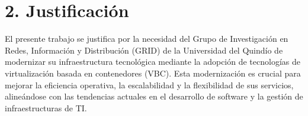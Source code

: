 \section*{2. Justificación}
El presente trabajo se justifica por la necesidad del Grupo de Investigación en Redes, Información y Distribución (GRID) de la Universidad del Quindío de modernizar su infraestructura tecnológica mediante la adopción de tecnologías de virtualización basada en contenedores (VBC). Esta modernización es crucial para mejorar la eficiencia operativa, la escalabilidad y la flexibilidad de sus servicios, alineándose con las tendencias actuales en el desarrollo de software y la gestión de infraestructuras de TI.